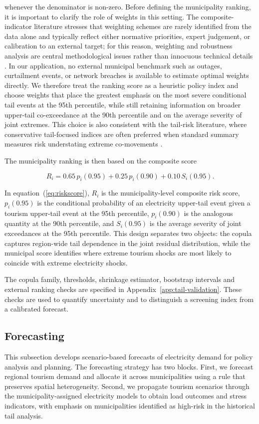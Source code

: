 \documentclass[11pt,a4paper]{article}
\begin{document}
whenever the denominator is non-zero. Before defining the municipality ranking, it is important to clarify the role of weights in this setting. The composite-indicator literature stresses that weighting schemes are rarely identified from the data alone and typically reflect either normative priorities, expert judgement, or calibration to an external target; for this reason, weighting and robustness analysis are central methodological issues rather than innocuous technical details \cite{nardo2008,greco2018}. In our application, no external municipal benchmark such as outages, curtailment events, or network breaches is available to estimate optimal weights directly. We therefore treat the ranking score as a heuristic policy index and choose weights that place the greatest emphasis on the most severe conditional tail events at the 95th percentile, while still retaining information on broader upper-tail co-exceedance at the 90th percentile and on the average severity of joint extremes. This choice is also consistent with the tail-risk literature, where conservative tail-focused indices are often preferred when standard summary measures risk understating extreme co-movements \cite{furman2015,joe2014}.

The municipality ranking is then based on the composite score

\begin{equation}
\label{eq:riskscore}
R_i = 0.65\, p_i(0.95) + 0.25\, p_i(0.90) + 0.10\, S_i(0.95).
\end{equation}

In equation~(\ref{eq:riskscore}), $R_i$ is the municipality-level composite risk score, $p_i(0.95)$ is the conditional probability of an electricity upper-tail event given a tourism upper-tail event at the 95th percentile, $p_i(0.90)$ is the analogous quantity at the 90th percentile, and $S_i(0.95)$ is the average severity of joint exceedances at the 95th percentile. This design separates two objects: the copula captures region-wide tail dependence in the joint residual distribution, while the municipal score identifies where extreme tourism shocks are most likely to coincide with extreme electricity shocks.

The copula family, thresholds, shrinkage estimator, bootstrap intervals and external ranking checks are specified in Appendix~\ref{app:tail-validation}. These checks are used to quantify uncertainty and to distinguish a screening index from a calibrated forecast.


\subsection{Forecasting}
This subsection develops scenario-based forecasts of electricity demand for policy analysis and planning. 
The forecasting strategy has two blocks. 
First, we forecast regional tourism demand and allocate it across municipalities using a 
rule that preserves spatial heterogeneity. 
Second, we propagate tourism scenarios through the municipality-assigned 
electricity models to obtain load outcomes and stress indicators, 
with emphasis on municipalities identified as high-risk in the historical tail analysis.
\end{document}
